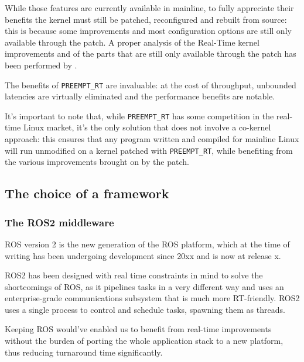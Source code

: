 \documentclass[a4paper,12pt]{report}
\begin{document}
While those features are currently available in mainline, to fully appreciate their benefits the kernel must still be patched, reconfigured and rebuilt from source: this is because some improvements and most configuration options are still only available through the patch. A proper analysis of the Real-Time kernel improvements and of the parts that are still only available through the patch has been performed by \textcite{survey-preempt-rt}.

The benefits of \texttt{PREEMPT\_RT}  are invaluable: at the cost of throughput, unbounded latencies are virtually eliminated and the performance benefits are notable\cite{dmoceri-benchmarking-rtlinux}.

It's important to note that, while \texttt{PREEMPT\_RT} has some competition in the real-time Linux market, it's the only solution that does not involve a co-kernel approach: this ensures that any program written and compiled for mainline Linux will run unmodified on a kernel patched with \texttt{PREEMPT\_RT}, while benefiting from the various improvements brought on by the patch. 

\subsection{The choice of a framework}

\subsubsection{The ROS2 middleware}

ROS version 2 is the new generation of the ROS platform, which at the time of writing has been undergoing development since 20xx and is now at release x.

ROS2 has been designed with real time constraints in mind to solve the shortcomings of ROS\cite{ros2-realtime-intro}, as it pipelines tasks in a very different way and uses an enterprise-grade communications subsystem that is much more RT-friendly. ROS2 uses a single process to control and schedule tasks, spawning them as threads.

Keeping ROS would've enabled us to benefit from real-time improvements without the burden of porting the whole application stack to a new platform, thus reducing turnaround time significantly. 
\end{document}
